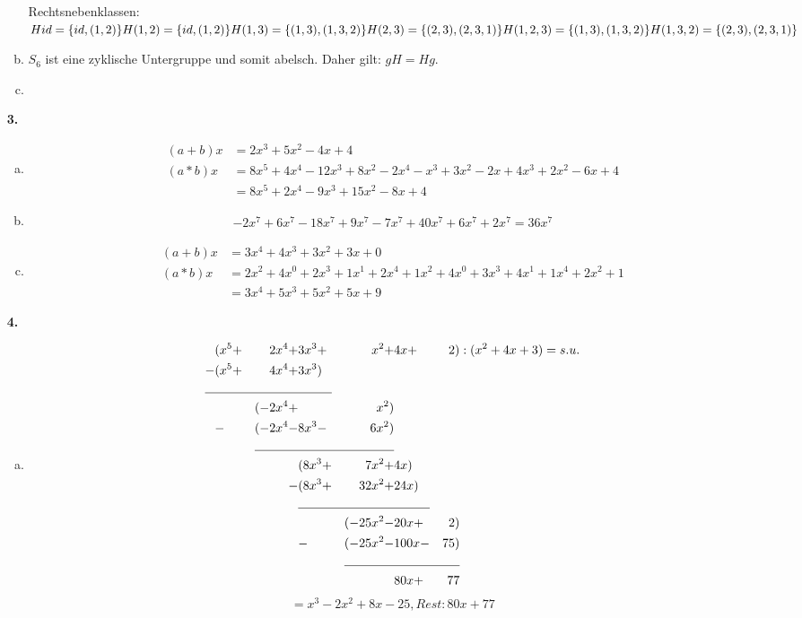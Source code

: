 \documentclass[a4paper]{scrartcl}
\begin{document}
\begin{enumerate}
\begin{enumerate}[a)]
Rechtsnebenklassen:\\
$Hid = \{ id , (1,2) \} \\
H(1,2) = \{ id , (1,2) \} \\
H(1,3) = \{ (1,3) , (1,3,2) \} \\
H(2,3) = \{ (2,3) , (2,3,1) \} \\
H(1,2,3) = \{ (1,3) , (1,3,2) \} \\
H(1,3,2) = \{ (2,3) , (2,3,1) \} $
\item
$S_6$ ist eine zyklische Untergruppe und somit abelsch. Daher gilt: 
$gH = Hg$.
\item 
\end{enumerate}
\item[\textbf{3.}]
\begin{enumerate}[a)]

\item
\begin{align}
(a+b)x &= 2x^3+5x^2-4x+4\\
(a*b)x &= 8x^5+4x^4-12x^3+8x^2-2x^4-x^3+3x^2-2x+4x^3+2x^2-6x+4\\
       &= 8x^5+2x^4-9x^3+15x^2-8x+4
\end{align}

\item
\begin{align}
-2x^7+6x^7-18x^7+9x^7-7x^7+40x^7+6x^7+2x^7 =36x^7
\end{align}

\item
\begin{align}
(a+b)x &= 3x^4+4x^3+3x^2+3x+0\\
(a*b)x &= 2x^2+4x^0+2x^3+1x^1+2x^4+1x^2+4x^0+3x^3+4x^1+1x^4+2x^2+1\\
       &= 3x^4+5x^3+5x^2+5x+9
\end{align}
\end{enumerate}

\item[\textbf{4.}]
\begin{enumerate}[a)]
\item
\begin{align}
 &(x^5 +& 2x^4  +& 3x^3 +&  x^2  +& 4x   +& 2) &: (x^2 + 4x + 3) = s.u.\\
-&(x^5 +& 4x^4  +& 3x^3) \\
\cline{1-4}
 &      &(-2x^4 +&       &  x^2) \\
 &     -&(-2x^4 -& 8x^3 -& 6x^2) \\
\cline{3-5}
 &      &        &(8x^3 +& 7x^2  +&  4x) \\
 &      &       -&(8x^3 +&32x^2  +& 24x) \\
\cline{4-6}
 &      &        &       &(-25x^2-& 20x  +& 2) \\
 &      &        &      -&(-25x^2-& 100x -& 75) \\
\cline{5-7}
 &      &        &       &        &  80x +& 77
\end{align}
\[=x^3-2x^2+8x-25, Rest:80x+77\]


\end{enumerate}
\end{enumerate}
\end{document}
